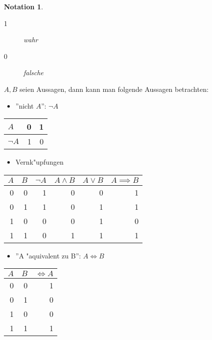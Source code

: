 \documentclass[11pt]{article}
\newtheorem*{notation}{Notation}
\begin{document}
\begin{notation}\
\begin{description}
\item[{1}] wahr
\item[{0}] falsche
\end{description}
\end{notation}

\(A,B\) seien Aussagen, dann kann man folgende Aussagen betrachten:
\begin{relation}
\begin{itemize}
\item ''nicht \(A\)'': \(\neg A\)
\end{itemize}
\begin{center}
\begin{tabular}{lrr}
\(A\) & 0 & 1\\
\hline
\(\neg A\) & 1 & 0\\
\end{tabular}
\end{center}

\begin{itemize}
\item Vernk"upfungen
\end{itemize}
\begin{center}
\begin{tabular}{rrrrrr}
\(A\) & \(B\) & \(\neg A\) & \(A\wedge B\) & \(A \vee B\) & \(A\implies B\)\\
\hline
0 & 0 & 1 & 0 & 0 & 1\\
0 & 1 & 1 & 0 & 1 & 1\\
1 & 0 & 0 & 0 & 1 & 0\\
1 & 1 & 0 & 1 & 1 & 1\\
\end{tabular}
\end{center}

\begin{itemize}
\item ''A "aquivalent zu B'':  \(A\iff B\)
\end{itemize}
\begin{center}
\begin{tabular}{rrr}
\(A\) & \(B\) & \(\iff A\)\\
\hline
0 & 0 & 1\\
0 & 1 & 0\\
1 & 0 & 0\\
1 & 1 & 1\\
\end{tabular}
\end{center}
\end{relation}
\end{document}
